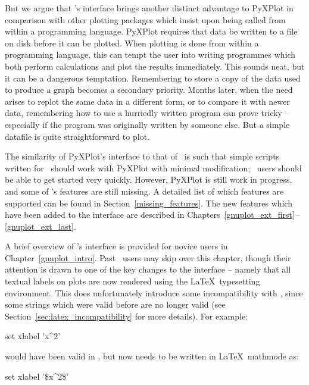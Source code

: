 But we argue that \gnuplot's interface brings another distinct advantage to
PyXPlot in comparison with other plotting packages which insist upon being
called from within a programming language. PyXPlot requires that data be
written to a file on disk before it can be plotted. When plotting is done from
within a programming language, this can tempt the user into writing programmes
which both perform calculations and plot the results immediately.  This sounds
neat, but it can be a dangerous temptation. Remembering to store a copy of the
data used to produce a graph becomes a secondary priority.  Months later, when
the need arises to replot the same data in a different form, or to compare it
with newer data, remembering how to use a hurriedly written program can prove
tricky -- especially if the program was originally written by someone else. But
a simple datafile is quite straightforward to plot.

The similarity of PyXPlot's interface to that of \gnuplot\ is such that simple
scripts written for \gnuplot\ should work with PyXPlot with minimal
modification; \gnuplot\ users should be able to get started very quickly.
However, PyXPlot is still work in progress, and some of \gnuplot's features are
still missing.  A detailed list of which features are supported can be found in
Section~\ref{missing_features}. The new features which have been added to the
interface are described in
Chapters~\ref{gnuplot_ext_first}\,--\,\ref{gnuplot_ext_last}.

A brief overview of \gnuplot's interface is provided for novice users in
Chapter~\ref{gnuplot_intro}. Past \gnuplot\ users may skip over this chapter,
though their attention is drawn to one of the key changes to the interface --
namely that all textual labels on plots are now rendered using the \LaTeX\
typesetting environment. This does unfortunately introduce some incompatibility
with \gnuplot, since some strings which were valid before are no longer valid
(see Section~\ref{sec:latex_incompatibility} for more details). For
example:\index{latex}

\begin{dontdo}
set xlabel 'x\^{}2'
\end{dontdo}

\noindent would have been valid in \gnuplot, but now needs to be written in
\LaTeX\ mathmode as:

\begin{dodo}
set xlabel '\$x\^{}2\$'
\end{dodo}

